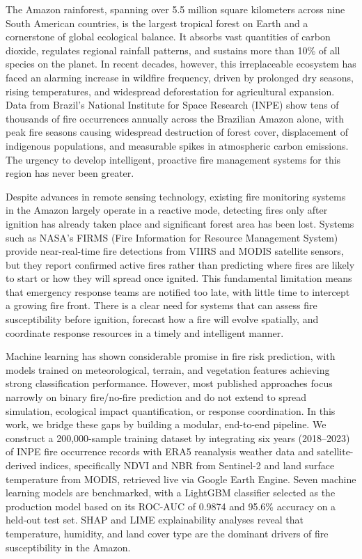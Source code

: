 \documentclass[12pt,a4paper]{article}
\begin{document}
The Amazon rainforest, spanning over 5.5 million square kilometers across nine South American countries, is the largest tropical forest on Earth and a cornerstone of global ecological balance. It absorbs vast quantities of carbon dioxide, regulates regional rainfall patterns, and sustains more than 10\% of all species on the planet. In recent decades, however, this irreplaceable ecosystem has faced an alarming increase in wildfire frequency, driven by prolonged dry seasons, rising temperatures, and widespread deforestation for agricultural expansion. Data from Brazil's National Institute for Space Research (INPE) show tens of thousands of fire occurrences annually across the Brazilian Amazon alone, with peak fire seasons causing widespread destruction of forest cover, displacement of indigenous populations, and measurable spikes in atmospheric carbon emissions. The urgency to develop intelligent, proactive fire management systems for this region has never been greater.

Despite advances in remote sensing technology, existing fire monitoring systems in the Amazon largely operate in a reactive mode, detecting fires only after ignition has already taken place and significant forest area has been lost. Systems such as NASA's FIRMS (Fire Information for Resource Management System) provide near-real-time fire detections from VIIRS and MODIS satellite sensors, but they report confirmed active fires rather than predicting where fires are likely to start or how they will spread once ignited. This fundamental limitation means that emergency response teams are notified too late, with little time to intercept a growing fire front. There is a clear need for systems that can assess fire susceptibility before ignition, forecast how a fire will evolve spatially, and coordinate response resources in a timely and intelligent manner.

Machine learning has shown considerable promise in fire risk prediction, with models trained on meteorological, terrain, and vegetation features achieving strong classification performance. However, most published approaches focus narrowly on binary fire/no-fire prediction and do not extend to spread simulation, ecological impact quantification, or response coordination. In this work, we bridge these gaps by building a modular, end-to-end pipeline. We construct a 200,000-sample training dataset by integrating six years (2018--2023) of INPE fire occurrence records with ERA5 reanalysis weather data and satellite-derived indices, specifically NDVI and NBR from Sentinel-2 and land surface temperature from MODIS, retrieved live via Google Earth Engine. Seven machine learning models are benchmarked, with a LightGBM classifier selected as the production model based on its ROC-AUC of 0.9874 and 95.6\% accuracy on a held-out test set. SHAP and LIME explainability analyses reveal that temperature, humidity, and land cover type are the dominant drivers of fire susceptibility in the Amazon.
\end{document}
